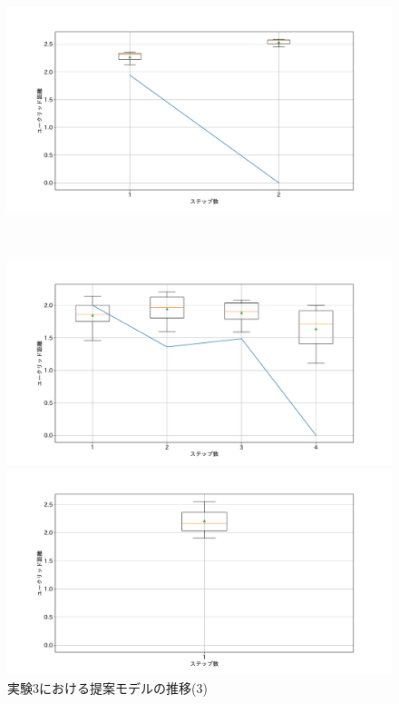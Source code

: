 \begin{figure}[h]
\begin{minipage}[b]{0.48\linewidth}
 \end{minipage}
 \begin{minipage}[b]{0.48\linewidth}
  \centering
  \includegraphics[scale=0.15]{./imgs/gaChange/sofa2_10.pdf}
 \end{minipage}\\
 \begin{minipage}[b]{0.48\linewidth}
  \centering
  \includegraphics[scale=0.15]{./imgs/gaChange/sofa1_11.pdf}
 \end{minipage}
 \begin{minipage}[b]{0.48\linewidth}
  \centering
  \includegraphics[scale=0.15]{./imgs/gaChange/sofa2_11.pdf}
 \end{minipage}
 \caption{実験3における提案モデルの推移(3)}\label{fig:gaChange2_3}
\end{figure}